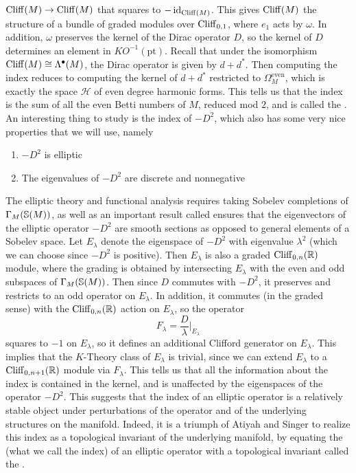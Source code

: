 $\Cliff(M) \to \Cliff(M)$ that squares to $-\id_{\Cliff(M)}$. This gives
$\Cliff(M)$ the structure of a bundle of graded modules over $\Cliff_{0,1}$, where
$e_1$ acts by $\omega$. In addition, $\omega$ preserves the kernel of the Dirac operator
$D$, so the kernel of $D$ determines an element in $KO^{-1}(\mathrm{pt})$. Recall
that under the isomorphism $\Cliff(M) \cong \Lambda^\bullet(M)$, the Dirac operator
is given by $d + d^*$. Then computing the index reduces to computing the kernel
of $d + d^*$ restricted to $\Omega^{\text{even}}_M$, which is exactly the space
$\mathcal{H}$ of even degree harmonic forms. This tells us that the index
is the sum of all the even Betti numbers of $M$, reduced mod $2$, and is called
the . \\

An interesting thing to study is the index of $-D^2$, which also has some very nice
properties that we will use, namely
\begin{enumerate}
  \item $-D^2$ is elliptic
  \item The eigenvalues of $-D^2$ are discrete and nonnegative
\end{enumerate}
%
The elliptic theory and functional analysis requires taking Sobelev completions of
$\Gamma_M(\S(M))$, as well as an important result called  ensures that the eigenvectors of the elliptic operator $-D^2$ are smooth
sections as opposed to general elements of a Sobelev space. Let $E_\lambda$ denote the
eigenspace of $-D^2$ with eigenvalue $\lambda^2$
(which we can choose since $-D^2$ is positive). Then $E_\lambda$ is also a graded
$\Cliff_{0,n}(\R)$ module, where the grading is obtained by intersecting $E_\lambda$
with the even and odd subspaces of $\Gamma_M(\S(M))$. Then since $D$ commutes with
$-D^2$, it preserves and restricts to an odd operator on $E_\lambda$. In addition,
it commutes (in the graded sense) with the $\Cliff_{0,n}(\R)$ action on $E_\lambda$,
so the operator
\[
F_\lambda = \frac{D}{\lambda}\bigg\vert_{E_\lambda}
\]
squares to $-1$ on $E_\lambda$, so it defines an additional Clifford generator on
$E_\lambda$. This implies that the $K$-Theory class of $E_\lambda$ is trivial, since
we can extend $E_\lambda$ to a $\Cliff_{0, n+1}(\R)$ module via $F_\lambda$. This
tells us that all the information about the index is contained in the kernel, and is
unaffected by the eigenspaces of the operator $-D^2$. This suggests that
the index of an elliptic operator is a relatively stable object under perturbations
of the operator and of the underlying structures on the manifold. Indeed, it is a
triumph of Atiyah and Singer to realize this index as a topological invariant of the
underlying manifold, by equating the  (what we call the index)
of an elliptic operator with a topological invariant called the .
%